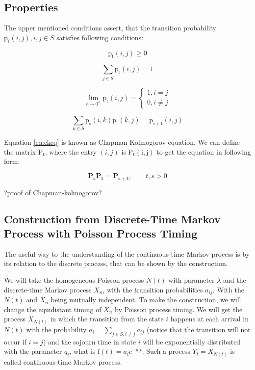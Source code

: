\documentclass[thesis=M,english]{FITthesis}[2012/10/20]
\newcommand{\matr}[1]{\mathbf{#1}}
\begin{document}
\subsection{Properties} 

The upper mentioned conditions assert, that the transition probability $\mathrm{p_t}(i,j), i,j \in S$ satisfies following conditions:%


\begin{equation}
\mathrm{p_t}(i,j) \geq 0
\end{equation}

\begin{equation}
\sum_{j \in S} \mathrm{p_t}(i,j) = 1
\end{equation}

\begin{equation}\label{eq:l0}  
\lim_{t \to 0^+} \mathrm{p_t}(i,j)= 
\begin{cases}
1, i = j\\
0, i \neq j
\end{cases}
\end{equation}

\begin{equation}\label{eq:ckeq}
\sum_{k \in S}\mathrm{p_s}(i,k)\mathrm{p_t}(k,j) = \mathrm{p_{s+t}}(i,j)     
\end{equation}

Equation \eqref{eq:ckeq} is known as Chapman-Kolmogorov equation. 
We can define the matrix $\mathrm{P_t}$, where the entry $(i,j)$ is $\mathrm{P_t(i,j)}$ to get the equation in following form:

\begin{equation}\label{eq:ckm}
\matr{P_s} \matr{P_t} = \matr{P_{s+t}},   \qquad t,s > 0  
\end{equation}

?proof of Chapman-kolmogorov?


\subsection{Construction from Discrete-Time Markov Process with Poisson Process Timing } 

The useful way to the understanding of the continuous-time Markov process is by its relation to the discrete process, that can be shown by the construction.

We will take the homogeneous Poisson process $N(t)$ with parameter $\lambda$ and the discrete-time Markov process $X_n$, with the transition probabilities $a_{ij}$. With the $N(t)$ and $X_n$ being mutually independent. To make the construction, we will change the equidistant timing of $X_n$ by Poisson process timing. We will get the process $X_{N(t)}$ in which the transition from the state $i$ happens at each arrival in $N(t)$ with the probability $a_i = \sum_{j\in S, i\neq j} a_{ij}$ (notice that the transition will not occur if $i=j$) and the sojourn time in state $i$ will be exponentially distributed with the parameter $q_i$, what is $\mathrm{f}(t)= a_i e^{-a_i t}$. Such a process $Y_t = X_{N(t)}$ is called continuous-time Markov process.
\end{document}
